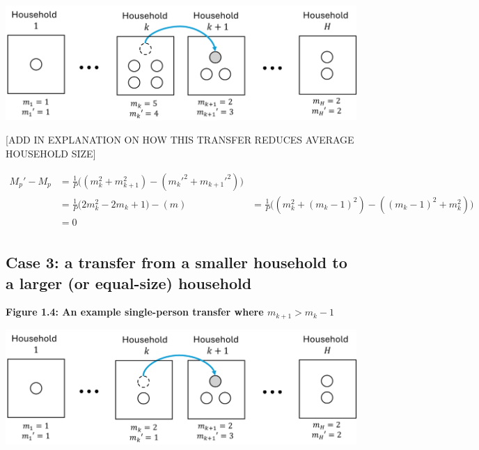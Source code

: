 \documentclass[
]{article}
\begin{document}
\includegraphics[width=1\linewidth]{proof_files/figure1-4}

{[}ADD IN EXPLANATION ON HOW THIS TRANSFER REDUCES AVERAGE HOUSEHOLD
SIZE{]}

\begin{align}
M_p' - M_p & = \frac{1}{P} \bigg( (m_k^2 + m_{k+1}^2) - (m_k'^2 + m_{k+1}'^2) \bigg) \\
& = \frac{1}{P} \bigg( 2m_k^2 - 2m_k + 1) - (m)
& = \frac{1}{P} \bigg( (m_k^2 + (m_k - 1)^2) - ((m_k-1)^2 + m_k^2) \bigg)\\
& = 0 \\
\end{align}

\hypertarget{case-3-a-transfer-from-a-smaller-household-to-a-larger-or-equal-size-household}{%
\subsection{Case 3: a transfer from a smaller household to a larger (or
equal-size)
household}\label{case-3-a-transfer-from-a-smaller-household-to-a-larger-or-equal-size-household}}

\textbf{Figure 1.4: An example single-person transfer where
\(m_{k+1} > m_k - 1\)}

\includegraphics[width=1\linewidth]{proof_files/figure1-5}
\end{document}
